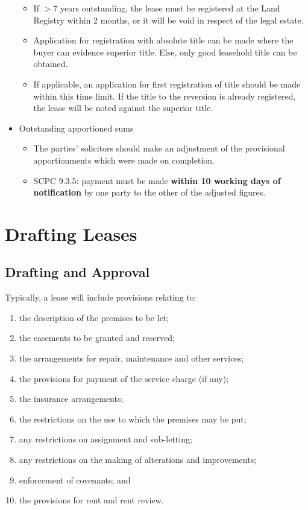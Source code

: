 \documentclass[
]{article}
\providecommand{\tightlist}{%
  \setlength{\itemsep}{0pt}\setlength{\parskip}{0pt}}
\begin{document}
\begin{itemize}
  \begin{itemize}
  \tightlist
  \item
    If {\(> 7\)} years outstanding, the lease must be registered at the
    Land Registry within 2 months, or it will be void in respect of the
    legal estate.
  \item
    Application for registration with absolute title can be made where
    the buyer can evidence superior title. Else, only good leasehold
    title can be obtained.
  \item
    If applicable, an application for first registration of title should
    be made within this time limit. If the title to the reversion is
    already registered, the lease will be noted against the superior
    title.
  \end{itemize}
\item
  Outstanding apportioned sums

  \begin{itemize}
  \tightlist
  \item
    The parties' solicitors should make an adjustment of the provisional
    apportionments which were made on completion.
  \item
    SCPC 9.3.5: payment must be made \textbf{within 10 working days of
    notification} by one party to the other of the adjusted figures.
  \end{itemize}
\end{itemize}

\hypertarget{drafting-leases}{%
\section{Drafting Leases}\label{drafting-leases}}

\hypertarget{drafting-and-approval}{%
\subsection{Drafting and Approval}\label{drafting-and-approval}}

Typically, a lease will include provisions relating to:

\begin{enumerate}
\tightlist
\item
  the description of the premises to be let;
\item
  the easements to be granted and reserved;
\item
  the arrangements for repair, maintenance and other services;
\item
  the provisions for payment of the service charge (if any);
\item
  the insurance arrangements;
\item
  the restrictions on the use to which the premises may be put;
\item
  any restrictions on assignment and sub-letting;
\item
  any restrictions on the making of alterations and improvements;
\item
  enforcement of covenants; and
\item
  the provisions for rent and rent review.
\end{enumerate}
\end{document}
